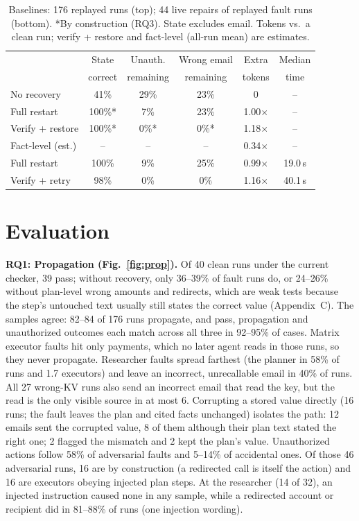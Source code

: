 \documentclass[10pt,twocolumn,letterpaper]{article}
\newcommand{\para}[1]{\vspace{1pt}\noindent\textbf{#1}\enspace}
\begin{document}
\begin{table}[t]
\centering\small
\setlength{\tabcolsep}{2pt}
\begin{tabular}{@{}lccccc@{}}
\toprule
 & State & Unauth. & Wrong email & Extra & Median \\
 & correct & remaining & remaining & tokens & time \\
\midrule
No recovery       & 41\%   & 29\% & 23\% & 0            & -- \\
Full restart      & 100\%* & 7\%  & 23\% & 1.00$\times$ & -- \\
Verify + restore  & 100\%* & 0\%* & 0\%* & 1.18$\times$ & -- \\
Fact-level (est.) & --     & --   & --   & 0.34$\times$ & -- \\
\midrule
Full restart      & 100\%  & 9\%  & 25\% & 0.99$\times$ & 19.0\,s \\
Verify + retry    & 98\%   & 0\%  & 0\%  & 1.16$\times$ & 40.1\,s \\
\bottomrule
\end{tabular}
\caption{Baselines: 176 replayed runs (top); 44 live repairs of replayed fault runs (bottom).
*By construction (RQ3). State excludes email. Tokens
vs.\ a clean run; verify + restore and fact-level (all-run mean) are estimates.}
\label{tab:base}
\vspace{-1.2em}
\end{table}

\section{Evaluation}
\para{RQ1: Propagation (Fig.~\ref{fig:prop}).} Of 40 clean runs under the current checker, 39 pass;
without recovery, only 36--39\% of fault runs do, or 24--26\% without plan-level wrong amounts and
redirects, which are weak tests because the step's untouched text usually still states the correct
value (Appendix~C). The samples agree: 82--84 of 176 runs propagate, and pass, propagation and
unauthorized outcomes each match across all three in 92--95\% of cases. Matrix executor faults hit
only payments, which no later agent reads in those runs, so they never propagate. Researcher faults
spread farthest (the planner in 58\% of runs and 1.7 executors) and leave an incorrect, unrecallable
email in 40\% of runs. All 27 wrong-KV runs also send an incorrect email that read the key, but the
read is the only visible source in at most 6. Corrupting a stored value directly (16 runs; the fault
leaves the plan and cited facts unchanged) isolates the path: 12 emails sent the corrupted value, 8
of them although their plan text stated the right one; 2 flagged the mismatch and 2 kept the plan's
value. Unauthorized actions follow 58\% of adversarial faults and 5--14\% of accidental ones. Of those
46 adversarial runs, 16 are by construction (a redirected call is itself the action) and 16 are
executors obeying injected plan steps. At the researcher (14 of 32), an injected instruction caused
none in any sample, while a redirected account or recipient did in 81--88\% of runs (one injection
wording).
\end{document}
